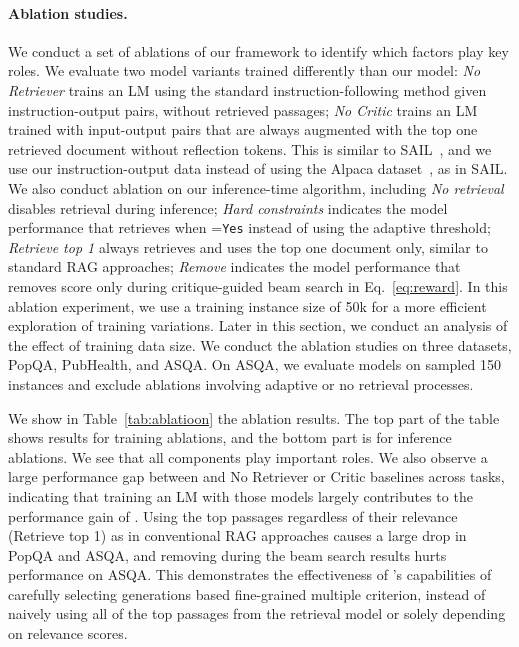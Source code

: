 \paragraph{Ablation studies.}
We conduct a set of ablations of our framework to identify which factors play key roles. 
We evaluate two model variants trained differently than our model: {\it No Retriever} trains an LM using the standard instruction-following method given instruction-output pairs, without retrieved passages;  {\it No Critic} trains an LM trained with input-output pairs that are always augmented with the top one retrieved document without reflection tokens. 
This is similar to SAIL~\citep{luo2023sail}, and we use our instruction-output data instead of using the Alpaca dataset~\citep{dubois2023alpacafarm}, as in SAIL. 
We also conduct ablation on our inference-time algorithm, including {\it No retrieval} disables retrieval during inference; {\it Hard constraints} indicates the model performance that retrieves when \ret=\texttt{Yes} instead of using the adaptive threshold; {\it Retrieve top 1} always retrieves and uses the top one document only, similar to standard RAG approaches; {\it Remove \cgr} indicates the model performance that removes \cgr score only during critique-guided beam search in Eq.~\ref{eq:reward}. 
{In this ablation experiment, we use a training instance size of 50k for a more efficient exploration of training variations. Later in this section, we conduct an analysis of the effect of training data size. 
We conduct the ablation studies on three datasets, PopQA, PubHealth, and ASQA. On ASQA, we evaluate models on sampled 150 instances and exclude ablations involving adaptive or no retrieval processes. }

We show in Table~\ref{tab:ablatioon} the ablation results. 
The top part of the table shows results for training ablations, and the bottom part is for inference ablations. We see that all components play important roles.
We also observe a large performance gap between \model and No Retriever or Critic baselines across tasks, indicating that training an LM with those models largely contributes to the performance gain of \model. 
{
Using the top passages regardless of their relevance (Retrieve top 1) as in conventional RAG approaches causes a large drop in PopQA and ASQA, and removing \cgr during the beam search results hurts performance on ASQA. 
This demonstrates the effectiveness of \model's capabilities of carefully selecting generations based fine-grained multiple criterion, instead of naively using all of the top passages from the retrieval model or solely depending on relevance scores. 
}


